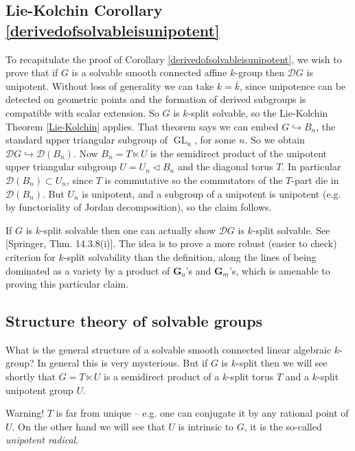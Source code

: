 \documentclass[10pt]{article}
\renewcommand{\(}{\left(}
\renewcommand{\)}{\right)}
\numberwithin{thm}{subsection}
\begin{document}
\subsection{Lie-Kolchin Corollary \ref{derivedofsolvableisunipotent}}
To recapitulate the proof of Corollary \ref{derivedofsolvableisunipotent},
we wish to prove that if $G$ is a solvable smooth connected affine $k$-group
then $\mathscr{D}G$ is unipotent.
Without loss of generality we can take $k=\overline{k}$, since unipotence
can be detected on geometric points and the formation of derived subgroups
is compatible with scalar extension.
So $G$ is $k$-split solvable,
so the Lie-Kolchin Theorem \ref{Lie-Kolchin} applies.
  That theorem says we can embed $G\hookrightarrow B_n$,
the standard upper triangular subgroup of $\operatorname{GL}_n$,
for some $n$.
So we obtain $\mathscr{D}G\hookrightarrow\mathscr{D}(B_n)$.
Now $B_n=T\ltimes U$
is the semidirect product of the unipotent upper triangular subgroup $U=U_n\vartriangleleft B_n$
and the diagonal torus $T$.
In particular $\mathscr{D}(B_n)\subset U_n$,
since $T$ is commutative so the commutators of the $T$-part die
in $\mathscr{D}(B_n)$.
But $U_n$ is unipotent,
and a subgroup of a unipotent is unipotent (e.g. by functoriality of Jordan decomposition), so the claim follows.

\begin{rem}\label{}
If $G$ is $k$-split solvable then one can actually show $\mathscr{D}G$
is $k$-split solvable. See [Springer, Thm. 14.3.8(i)].
The idea is to prove a more robust (easier to check)
criterion for $k$-split solvability than the definition,
along the lines of being dominated as a variety by a product
of $\mathbf{G}_a$'s and $\mathbf{G}_m$'s, which is amenable to proving this particular claim.
\end{rem}
\subsection{Structure theory of solvable groups}
What is the general structure of a solvable smooth connected linear algebraic $k$-group? In general this is very mysterious.
But if $G$ is $k$-split then we will see shortly
that $G=T\ltimes U$ is a semidirect product
of a $k$-split torus $T$
and a $k$-split unipotent group $U$.

Warning! $T$ is far from unique -- e.g. one can conjugate it by any rational point of $U$. On the other hand we will see that $U$ is intrinsic to $G$,
it is the so-called \textit{unipotent radical}.
\end{document}
